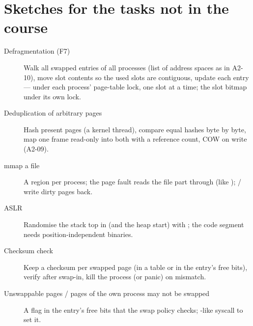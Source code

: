 \section{Sketches for the tasks not in the course}

\begin{description}
\item[Defragmentation (F7)] Walk all swapped entries of all processes (list of address spaces as in
  A2-10), move slot contents so the used slots are contiguous, update each entry --- under each
  process' page-table lock, one slot at a time; the slot bitmap under its own lock.
\item[Deduplication of arbitrary pages] Hash present pages (a kernel thread), compare equal hashes
  byte by byte, map one frame read-only into both with a reference count, COW on write (A2-09).
\item[mmap a file] A region per process; the page fault reads the file part through
   (like ); / write dirty pages back.
\item[ASLR] Randomise the stack top in  (and the heap start) with ;
  the code segment needs position-independent binaries.
\item[Checksum check] Keep a checksum per swapped page (in a table or in the entry's free bits),
  verify after swap-in, kill the process (or panic) on mismatch.
\item[Unswappable pages / pages of the own process may not be swapped] A flag in the entry's free
  bits that the swap policy checks; -like syscall to set it.
\end{description}
